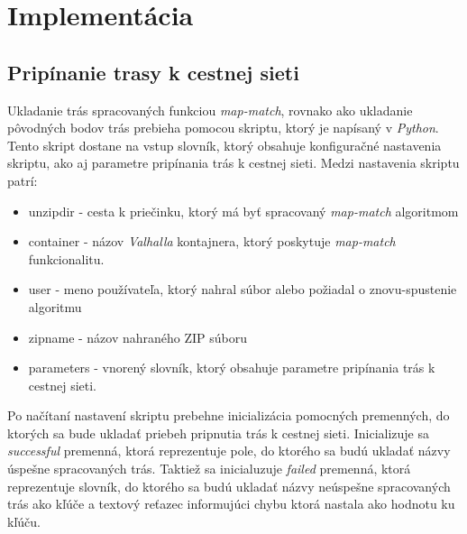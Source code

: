 \section{Implementácia}
\subsection{Pripínanie trasy k cestnej sieti}

Ukladanie trás spracovaných funkciou \textit{map-match}, rovnako ako ukladanie pôvodných bodov trás prebieha pomocou skriptu, ktorý je napísaný v \textit{Python}. Tento skript dostane na vstup slovník, ktorý obsahuje konfiguračné nastavenia skriptu, ako aj parametre pripínania trás k cestnej sieti. Medzi nastavenia skriptu patrí:
\begin{itemize}
  \item unzipdir - cesta k priečinku, ktorý má byť spracovaný \textit{map-match} algoritmom
  \item container - názov \textit{Valhalla} kontajnera, ktorý poskytuje \textit{map-match} funkcionalitu.
  \item user - meno používateľa, ktorý nahral súbor alebo požiadal o znovu-spustenie algoritmu
  \item zipname - názov nahraného ZIP súboru
  \item parameters - vnorený slovník, ktorý obsahuje parametre pripínania trás k cestnej sieti.
\end{itemize}

Po načítaní nastavení skriptu prebehne inicializácia pomocných premenných, do ktorých sa bude ukladať priebeh pripnutia trás k cestnej sieti. Inicializuje sa \textit{successful} premenná, ktorá reprezentuje pole, do ktorého sa budú ukladať názvy úspešne spracovaných trás. Taktiež sa inicialuzuje \textit{failed} premenná, ktorá reprezentuje slovník, do ktorého sa budú ukladať názvy neúspešne spracovaných trás ako kľúče a textový reťazec informujúci chybu ktorá nastala ako hodnotu ku kľúču.

